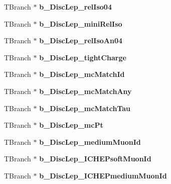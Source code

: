 \begin{DoxyCompactItemize}
\item 
\hypertarget{classMiniTree_abe6e23e3f339a322d3f2603686bafc6f}{}\label{classMiniTree_abe6e23e3f339a322d3f2603686bafc6f} 
T\+Branch $\ast$ {\bfseries b\+\_\+\+Disc\+Lep\+\_\+rel\+Iso04}
\item 
\hypertarget{classMiniTree_a854f4a43655495cdbba306a5f9472970}{}\label{classMiniTree_a854f4a43655495cdbba306a5f9472970} 
T\+Branch $\ast$ {\bfseries b\+\_\+\+Disc\+Lep\+\_\+mini\+Rel\+Iso}
\item 
\hypertarget{classMiniTree_a9baf7605c9831294f5c7618a59d697ec}{}\label{classMiniTree_a9baf7605c9831294f5c7618a59d697ec} 
T\+Branch $\ast$ {\bfseries b\+\_\+\+Disc\+Lep\+\_\+rel\+Iso\+An04}
\item 
\hypertarget{classMiniTree_a5f55d94e2a24653bd3f12174c51e6d39}{}\label{classMiniTree_a5f55d94e2a24653bd3f12174c51e6d39} 
T\+Branch $\ast$ {\bfseries b\+\_\+\+Disc\+Lep\+\_\+tight\+Charge}
\item 
\hypertarget{classMiniTree_a28be65cf0ddab23b23c8bca2eccaa896}{}\label{classMiniTree_a28be65cf0ddab23b23c8bca2eccaa896} 
T\+Branch $\ast$ {\bfseries b\+\_\+\+Disc\+Lep\+\_\+mc\+Match\+Id}
\item 
\hypertarget{classMiniTree_aa9df997d81e5c3b625e897cf7525144c}{}\label{classMiniTree_aa9df997d81e5c3b625e897cf7525144c} 
T\+Branch $\ast$ {\bfseries b\+\_\+\+Disc\+Lep\+\_\+mc\+Match\+Any}
\item 
\hypertarget{classMiniTree_a4ae2c4f7630e37bb2bff4caf99e5491f}{}\label{classMiniTree_a4ae2c4f7630e37bb2bff4caf99e5491f} 
T\+Branch $\ast$ {\bfseries b\+\_\+\+Disc\+Lep\+\_\+mc\+Match\+Tau}
\item 
\hypertarget{classMiniTree_ae1a7c78ea041f5f467e015210eff6990}{}\label{classMiniTree_ae1a7c78ea041f5f467e015210eff6990} 
T\+Branch $\ast$ {\bfseries b\+\_\+\+Disc\+Lep\+\_\+mc\+Pt}
\item 
\hypertarget{classMiniTree_a60c69cdbcf5b8b5bd9e00474ef66c5d1}{}\label{classMiniTree_a60c69cdbcf5b8b5bd9e00474ef66c5d1} 
T\+Branch $\ast$ {\bfseries b\+\_\+\+Disc\+Lep\+\_\+medium\+Muon\+Id}
\item 
\hypertarget{classMiniTree_aab38d9a06b2dd9611ca09770a4a3e02a}{}\label{classMiniTree_aab38d9a06b2dd9611ca09770a4a3e02a} 
T\+Branch $\ast$ {\bfseries b\+\_\+\+Disc\+Lep\+\_\+\+I\+C\+H\+E\+Psoft\+Muon\+Id}
\item 
\hypertarget{classMiniTree_a4c59fa65d857afdb19e250685ce6c6a1}{}\label{classMiniTree_a4c59fa65d857afdb19e250685ce6c6a1} 
T\+Branch $\ast$ {\bfseries b\+\_\+\+Disc\+Lep\+\_\+\+I\+C\+H\+E\+Pmedium\+Muon\+Id}

\end{DoxyCompactItemize}
